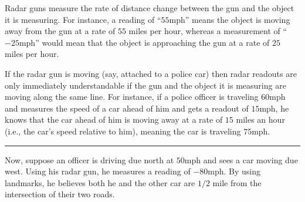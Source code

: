 \documentclass{ximera}
\author{Gregory Hartman \and Matthew Carr}
\begin{document}
\begin{exercise}




Radar guns measure the rate of distance change between the gun and the object it is measuring. For instance, a reading of ``$55$mph'' means the object is moving away from the gun at a rate of $55$ miles per hour, whereas a measurement of ``$-25$mph'' would mean that the object is approaching the gun at a rate of $25$ miles per hour.

If the radar gun is moving (say, attached to a police car) then radar readouts are only immediately understandable if the gun and the object it is measuring are moving along the same line. For instance, if a police officer is traveling $60$mph and measures the speed of a car ahead of him and gets a readout of $15$mph, he knows that the car ahead of him is moving away at a rate of $15$ miles an hour (i.e., the car's speed relative to him), meaning the car is traveling $75$mph.

\noindent\rule{12.25cm}{0.33pt}


Now, suppose an officer is driving due north at $50$mph and sees a car moving due west. Using his radar gun, he measures a reading of $-80$mph. By using landmarks, he believes both he and the other car are $1/2$ mile from the intersection of their two roads.


\end{exercise}
\end{document}
